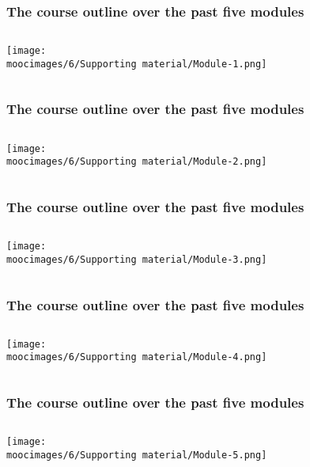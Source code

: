 \documentclass[handout,11pt,aspectratio=169,mathserif]{beamer}
\begin{document}

\begin{frame}\frametitle{The course outline over the past five modules}
	\begin{columns}[T]
			\centerline{\texttt{[image: \\moocimages/6/Supporting material/Module-1.png]}}
	\end{columns}
\end{frame}

\begin{frame}\frametitle{The course outline over the past five modules}
	\begin{columns}[T]
			\centerline{\texttt{[image: \\moocimages/6/Supporting material/Module-2.png]}}
	\end{columns}
\end{frame}

\begin{frame}\frametitle{The course outline over the past five modules}
	\begin{columns}[T]
			\centerline{\texttt{[image: \\moocimages/6/Supporting material/Module-3.png]}}
	\end{columns}
\end{frame}

\begin{frame}\frametitle{The course outline over the past five modules}
	\begin{columns}[T]
			\centerline{\texttt{[image: \\moocimages/6/Supporting material/Module-4.png]}}
	\end{columns}
\end{frame}

\begin{frame}\frametitle{The course outline over the past five modules}
	\begin{columns}[T]
			\centerline{\texttt{[image: \\moocimages/6/Supporting material/Module-5.png]}}
	\end{columns}
\end{frame}
\end{document}
